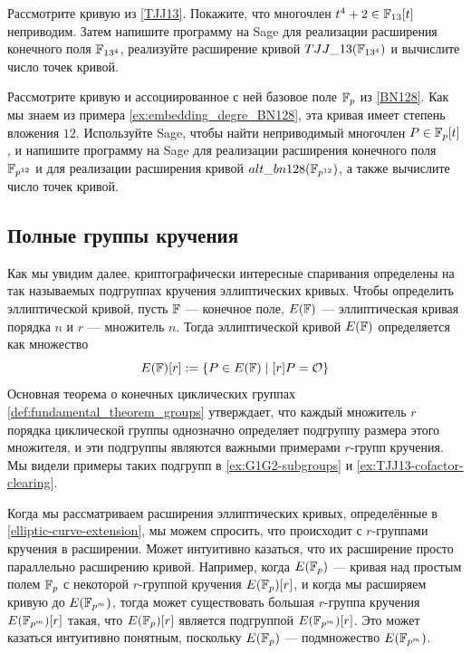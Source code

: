 \begin{exercise}
\label{exercise:TJJ134}
 Рассмотрите кривую  из \examplename{} \ref{TJJ13}. Покажите, что многочлен $t^4+2\in \mathbb{F}_{13}[t]$ неприводим. Затем напишите программу на Sage для реализации расширения конечного поля $\mathbb{F}_{13^4}$, реализуйте расширение кривой $TJJ\_13(\mathbb{F}_{13^4})$ и вычислите число точек кривой.
\end{exercise}
\begin{exercise}
\label{exercise:BN128-extension}
Рассмотрите кривую  и ассоциированное с ней базовое поле $\mathbb{F}_p$ из \examplename{} \ref{BN128}. Как мы знаем из примера \ref{ex:embedding_degre_BN128}, эта кривая имеет степень вложения $12$. Используйте Sage, чтобы найти неприводимый многочлен $P\in \mathbb{F}_p[t]$, и напишите программу на Sage для реализации расширения конечного поля $\mathbb{F}_{p^{12}}$ и для реализации расширения кривой $alt\_bn128(\mathbb{F}_{p^{12}})$, а также вычислите число точек кривой.
\end{exercise}
\subsection{Полные группы кручения}
\label{sec:full-torsion} Как мы увидим далее, криптографически интересные спаривания определены на так называемых подгруппах кручения эллиптических кривых. Чтобы определить  эллиптической кривой, пусть $\mathbb{F}$ — конечное поле, $E(\mathbb{F})$ — эллиптическая кривая порядка $n$ и $r$ — множитель $n$. Тогда  эллиптической кривой $E(\mathbb{F})$ определяется как множество
\begin{equation}
\label{def:torsion_group}
E(\mathbb{F})[r]:= \{P\in E(\mathbb{F})\;|\; [r]P = \mathcal{O}\}
\end{equation} 
Основная теорема о конечных циклических группах \ref{def:fundamental_theorem_groups} утверждает, что каждый множитель $r$ порядка циклической группы однозначно определяет подгруппу размера этого множителя, и эти подгруппы являются важными примерами $r$-групп кручения. Мы видели примеры таких подгрупп в \ref{ex:G1G2-subgroups} и \ref{ex:TJJ13-cofactor-clearing}.

Когда мы рассматриваем расширения эллиптических кривых, определённые в \ref{elliptic-curve-extension}, мы можем спросить, что происходит с $r$-группами кручения в расширении. Может интуитивно казаться, что их расширение просто параллельно расширению кривой. Например, когда $E(\mathbb{F}_p)$ — кривая над простым полем $\mathbb{F}_p$ с некоторой $r$-группой кручения $E(\mathbb{F}_p)[r]$, и когда мы расширяем кривую до $E(\mathbb{F}_{p^m})$, тогда может существовать большая $r$-группа кручения $E(\mathbb{F}_{p^m})[r]$ такая, что $E(\mathbb{F}_p)[r]$ является подгруппой $E(\mathbb{F}_{p^m})[r]$. Это может казаться интуитивно понятным, поскольку $E(\mathbb{F}_p)$ — подмножество $E(\mathbb{F}_{p^m})$. 

